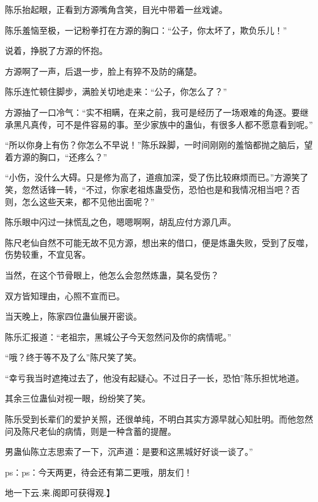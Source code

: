 \begin{this_body}
陈乐抬起眼，正看到方源嘴角含笑，目光中带着一丝戏谑。

陈乐羞恼至极，一记粉拳打在方源的胸口：“公子，你太坏了，欺负乐儿！”

说着，挣脱了方源的怀抱。

方源啊了一声，后退一步，脸上有猝不及防的痛楚。

陈乐连忙顿住脚步，满脸关切地走来：“公子，你怎么了？”

方源抽了一口冷气：“实不相瞒，在来之前，我可是经历了一场艰难的角逐。要继承黑凡真传，可不是件容易的事。至少家族中的蛊仙，有很多人都不愿意看到呢。”

“所以你身上有伤？你怎么不早说！”陈乐跺脚，一时间刚刚的羞恼都抛之脑后，望着方源的胸口，“还疼么？”

“小伤，没什么大碍。只是修为高了，道痕加深，受了伤比较麻烦而已。”方源笑了笑，忽然话锋一转，“不过，你家老祖炼蛊受伤，恐怕也是和我情况相当吧？否则，怎么这些天来，都不见他出面呢？”

陈乐眼中闪过一抹慌乱之色，嗯嗯啊啊，胡乱应付方源几声。

陈尺老仙自然不可能无故不见方源，想出来的借口，便是炼蛊失败，受到了反噬，伤势较重，不宜见客。

当然，在这个节骨眼上，他怎么会忽然炼蛊，莫名受伤？

双方皆知理由，心照不宣而已。

当天晚上，陈家四位蛊仙展开密谈。

陈乐汇报道：“老祖宗，黑城公子今天忽然问及你的病情呢。”

“哦？终于等不及了么”陈尺笑了笑。

“幸亏我当时遮掩过去了，他没有起疑心。不过日子一长，恐怕”陈乐担忧地道。

其余三位蛊仙对视一眼，纷纷笑了笑。

陈乐受到长辈们的爱护关照，还很单纯，不明白其实方源早就心知肚明。而他忽然问及陈尺老仙的病情，则是一种含蓄的提醒。

男蛊仙陈立志思索了一下，沉声道：是要和这黑城好好谈一谈了。”

ps：ps：今天两更，待会还有第二更哦，朋友们！

地一下云.来.阁即可获得观.】

\end{this_body}

